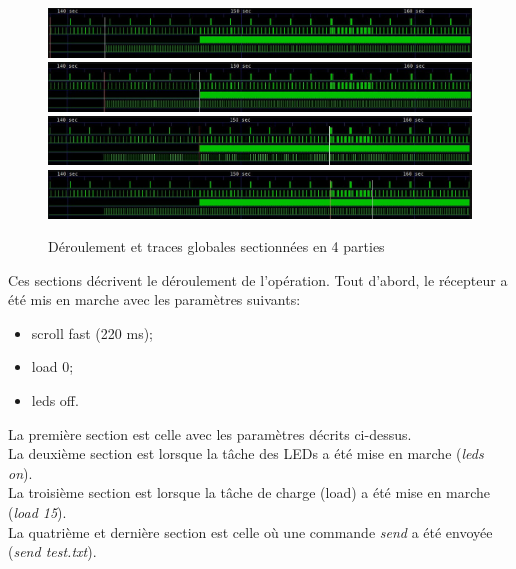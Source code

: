 \documentclass[11pt, a4paper]{article}
\begin{document}
\begin{figure}[H]
    \begin{center}
        \includegraphics[width=1\textwidth]{global_section1_empty}
        \includegraphics[width=1\textwidth]{global_section2_leds}
        \includegraphics[width=1\textwidth]{global_section3_load}
        \includegraphics[width=1\textwidth]{global_section4_send}
    \end{center}
    \caption{Déroulement et traces globales sectionnées en 4 parties}
    \label{Déroulement et traces globales sectionnées en 4 parties}
\end{figure}

Ces sections décrivent le déroulement de l'opération.
Tout d'abord, le récepteur a été mis en marche avec les paramètres suivants:
\begin{itemize}
    \item scroll fast (220 ms);
    \item load 0;
    \item leds off. \\
\end{itemize}

La première section est celle avec les paramètres décrits ci-dessus. \\
La deuxième section est lorsque la tâche des LEDs a été mise en marche (\textit{leds on}). \\
La troisième section est lorsque la tâche de charge (load) a été mise en marche (\textit{load 15}). \\
La quatrième et dernière section est celle où une commande \textit{send} a été envoyée (\textit{send test.txt}). \\
\end{document}
